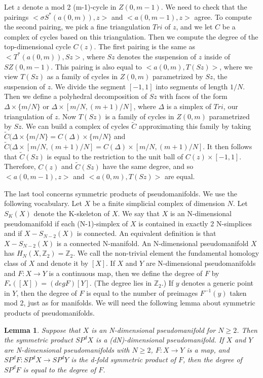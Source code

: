 \documentclass{amsart}
\newtheorem*{Theorem 1}{Theorem 1}
\newtheorem*{Theorem 2}{Theorem 2}
\newtheorem*{Theorem 1A}{Theorem 1A}
\newtheorem*{Theorem 2A}{Theorem 2A}
\newtheorem{lemma}{Lemma}[section]
\newtheorem*{vanishing lemma}{Vanishing Lemma}
\numberwithin{equation}{section}
\begin{document}
\proof Let $z$ denote a mod 2 (m-1)-cycle in $Z(0,m-1)$.  We need
to check that the pairings $<\sigma S^*(a(0,m)), z>$ and
$<a(0,m-1), z>$ agree.  To compute the second pairing, we pick a
fine triangulation $Tri$ of $z$, and we let $C$ be a complex of
cycles based on this triangulation. Then we compute the degree of
the top-dimensional cycle $C(z)$.  The first pairing is the same
as $<T^*(a(0,m)), Sz>$, where $Sz$ denotes the suspension of $z$
inside of $S Z(0,m-1)$.  This pairing is also equal to $<a(0,m),
T(Sz)>$, where we view $T(Sz)$ as a family of cycles in $Z(0,m)$
parametrized by $Sz$, the suspension of $z$.  We divide the
segment $[-1, 1]$ into segments of length $1/N$.  Then we define
a polyhedral decomposition of $Sz$ with faces of the form $\Delta
\times \{m/N \}$ or $\Delta \times [m/N, (m+1)/N]$, where
$\Delta$ is a simplex of $Tri$, our triangulation of $z$.  Now
$T(Sz)$ is a family of cycles in $Z(0,m)$ parametrized by $Sz$. 
We can build a complex of cycles $\tilde C$ approximating this
family by taking $\tilde C (\Delta \times \{ m/N \} = C(\Delta)
\times \{m/N\}$ and $\tilde C(\Delta \times [m/N, (m+1)/N] =
C(\Delta) \times [m/N, (m+1)/N]$.  It then follows that $\tilde
C(Sz)$ is equal to the restriction to the unit ball of $C(z)
\times [-1,1]$.  Therefore, $C(z)$ and $\tilde C(Sz)$ have the
same degree, and so $<a(0,m-1), z>$ and $<a(0,m), T(Sz)>$ are
equal. \endproof

The last tool concerns symmetric products of pseudomanifolds.  
We use the following vocabulary.
Let $X$ be a finite simplicial complex
of dimension $N$.  Let $S_K(X)$ denote the K-skeleton of $X$.  We
say that $X$ is an N-dimensional pseudomanifold if each (N-1)-simplex of $X$ is 
contained in exactly 2 N-simplices and if $X - S_{N-2}(X)$ is connected.
An equivalent definition is that $X - S_{N-2}(X)$ is a connected N-manifold.
An N-dimensional pseudomanifold $X$ has $H_N(X, \mathbb{Z}_2) = \mathbb{Z}_2$.  We call
the non-trivial element the fundamental homology class of $X$ and denote
it by $[X]$.  If $X$ and $Y$ are N-dimensional pseudomanifolds and $F: X \rightarrow Y$
is a continuous map, then we define the degree of $F$ by $F_*([X]) = (deg F) [Y]$.  
(The degree lies in $\mathbb{Z}_2$.)  If $y$ denotes a generic point in $Y$, then
the degree of $F$ is equal to the number of preimages $F^{-1}(y)$ taken
mod 2, just as for manifolds.  We will need the following lemma about
symmetric products of pseudomanifolds.

\begin{lemma} Suppose that $X$ is an N-dimensional pseudomanifold for $N \ge 2$.  Then
the symmetric product $SP^d X$ is a (dN)-dimensional pseudomanifold.  If $X$ and $Y$
are N-dimensional pseudomanifolds with $N \ge 2$, $F: X \rightarrow Y$ is a map, and 
$SP^d F: SP^d X \rightarrow SP^d Y$ is the d-fold symmetric product of $F$,
then the degree of $SP^d F$ is equal to the degree of $F$.
\end{lemma}
\end{document}
